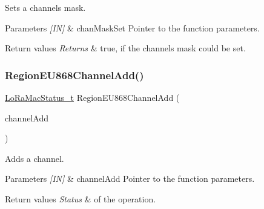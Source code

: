 Sets a channels mask. 


\begin{DoxyParams}{Parameters}
{\em \mbox{[}\+I\+N\mbox{]}} & chan\+Mask\+Set Pointer to the function parameters.\\
\hline
\end{DoxyParams}

\begin{DoxyRetVals}{Return values}
{\em Returns} & true, if the channels mask could be set. \\
\hline
\end{DoxyRetVals}
\mbox{\label{group__REGIONEU868_gaa51182eab8774612408fd0ea8f89f63b}} 
\subsubsection{\texorpdfstring{Region\+E\+U868\+Channel\+Add()}{RegionEU868ChannelAdd()}}
{\footnotesize\ttfamily \hyperlink{group__LORAMAC_ga30bd25657e10480f8605ee951b0ecfbd}{Lo\+Ra\+Mac\+Status\+\_\+t} Region\+E\+U868\+Channel\+Add (\begin{DoxyParamCaption}\item[{\hyperlink{group__REGION_gab1c5f3aa06614283202906cef4417860}{Channel\+Add\+Params\+\_\+t} $\ast$}]{channel\+Add }\end{DoxyParamCaption})}



Adds a channel. 


\begin{DoxyParams}{Parameters}
{\em \mbox{[}\+I\+N\mbox{]}} & channel\+Add Pointer to the function parameters.\\
\hline
\end{DoxyParams}

\begin{DoxyRetVals}{Return values}
{\em Status} & of the operation. \\
\hline
\end{DoxyRetVals}
\mbox{\label{group__REGIONEU868_gac30e0032ee1e6f09d4ee032e7169e238}} 
